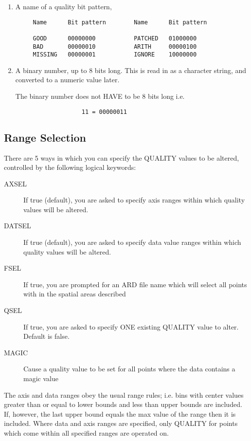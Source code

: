 \documentclass{book}
\renewcommand{\_}{{\tt\char'137}}     %
\begin{document}
\begin{enumerate}
\item A name of a quality bit pattern,
\begin{verbatim}
     Name      Bit pattern        Name      Bit pattern

     GOOD      00000000           PATCHED   01000000
     BAD       00000010           ARITH     00000100
     MISSING   00000001           IGNORE    10000000
\end{verbatim}
\item A binary number, up to 8 bits long. This is read in as a
character string, and converted to a numeric value later.

The binary number does not HAVE to be 8 bits long i.e.
\begin{verbatim}
                   11 = 00000011
\end{verbatim}
\end{enumerate}
\subsection{Range Selection}
There are 5 ways in which you can specify the QUALITY values to
be altered, controlled by the following logical keywords:


\begin{description}
\item[AXSEL]
If true (default), you are asked to specify axis
ranges within which quality values will be altered.
\item[DATSEL]
If true (default), you are asked to specify data
value ranges within which quality values will be
altered.
\item[FSEL]
If true, you are prompted for an ARD file name
which will select all points with in the spatial
areas described
\item[QSEL]
If true, you are asked to specify ONE existing
QUALITY value to alter. Default is false.
\item[MAGIC]
Cause a quality value to be set for all points
where the data contains a magic value
\end{description}
The axis and data ranges obey the usual range rules; i.e. bins
with center values greater than or equal to lower bounds and less
than upper bounds are included. If, however, the last upper bound
equals the max value of the range then it is included. Where data
and axis ranges are specified, only QUALITY for points which come
within all specified ranges are operated on.
\end{document}
